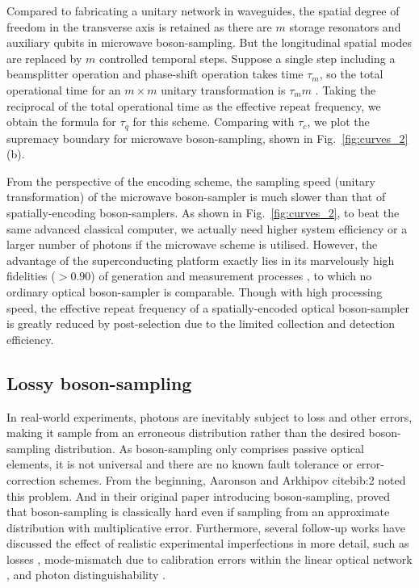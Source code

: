 \documentclass[aps,rmp,twocolumn,amsmath,amssymb,nofootinbib,superscriptaddress]{revtex4}
\newcommand{\comment}[1]{{\color{blue}{#1}}}
\begin{document}
Compared to fabricating a unitary network in waveguides, the spatial degree of freedom in the transverse axis is retained as there are $m$ storage resonators and auxiliary qubits in microwave boson-sampling. But the longitudinal spatial modes are replaced by $m$ controlled temporal steps. Suppose a single step including a beamsplitter operation and phase-shift operation takes time $\tau_m$, so the total operational time for an \mbox{$m\times m$} unitary transformation is $\tau_m m$ \comment{Shouldn't this be $m^2$?}. Taking the reciprocal of the total operational time as the effective repeat frequency, we obtain the formula for $\tau_q$ for this scheme. Comparing with $\tau_c$, we plot the supremacy boundary for microwave boson-sampling, shown in Fig.~\ref{fig:curves_2}(b).

From the perspective of the encoding scheme, the sampling speed (unitary transformation) of the microwave boson-sampler is much slower than that of spatially-encoding boson-samplers. As shown in Fig.~\ref{fig:curves_2}, to beat the same advanced classical computer, we actually need higher system efficiency or a larger number of photons if the microwave scheme is utilised. However, the advantage of the superconducting platform exactly lies in its marvelously high fidelities ($>0.90$) of generation and measurement processes \cite{bib:21}, to which no ordinary optical boson-sampler is comparable. Though with high processing speed, the effective repeat frequency of a spatially-encoded optical boson-sampler is greatly reduced by post-selection due to the limited collection and detection efficiency. \comment{This doesn't make sense to me - explain it better}

\subsection{Lossy boson-sampling}

In real-world experiments, photons are inevitably subject to loss and other errors, making it sample from an erroneous distribution rather than the desired boson-sampling distribution. As boson-sampling only comprises passive optical elements, it is not universal and there are no known fault tolerance or error-correction schemes. From the beginning, Aaronson and Arkhipov 
cite{bib:2} noted this problem. And in their original paper introducing boson-sampling, proved that boson-sampling is classically hard even if sampling from an approximate distribution with multiplicative error. Furthermore, several follow-up works have discussed the effect of realistic experimental imperfections in more detail, such as losses \cite{bib:22}, mode-mismatch due to calibration errors within the linear optical network \cite{bib:23, bib:24}, and photon distinguishability \cite{bib:25, bib:26, bib:27, bib:28, bib:29, bib:30}.
\end{document}
